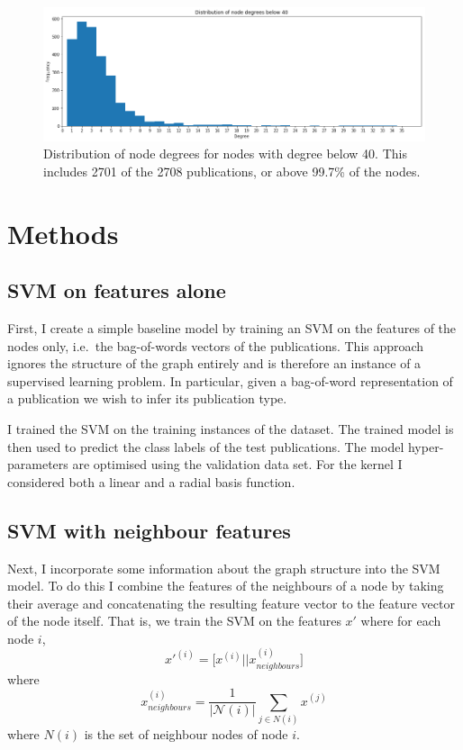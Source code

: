 \documentclass[12pt]{article}
\theoremstyle{definition}
\begin{document}
\begin{figure}[h]
	\includegraphics[width=1.0\textwidth]{node_degrees_truncated}
	\centering
	\caption{Distribution of node degrees for nodes with degree below 40. This includes 2701 of the 2708 publications, or above 99.7\% of the nodes.}
	\label{fig/node_degrees_truncated}
\end{figure}

\section{Methods}
\subsection{SVM on features alone}
First, I create a simple baseline model by training an SVM on the features of the nodes only, i.e.\ the bag-of-words vectors of the publications. This approach ignores the structure of the graph entirely and is therefore an instance of a supervised learning problem. In particular, given a bag-of-word representation of a publication we wish to infer its publication type. 

I trained the SVM on the training instances of the dataset. The trained model is then used to predict the class labels of the test publications. The model hyper-parameters are optimised using the validation data set. For the kernel I considered both a linear and a radial basis function.

\subsection{SVM with neighbour features}
Next, I incorporate some information about the graph structure into the SVM model. To do this I combine the features of the neighbours of a node by taking their average and concatenating the resulting feature vector to the feature vector of the node itself. That is, we train the SVM on the features $x'$ where for each node $i$,
\[
	x'^{(i)} = \big[x^{(i)} || x_{neighbours}^{(i)} \big]
\]
where
\[
	x_{neighbours}^{(i)} = \frac{1}{\left\vert \mathcal{N}(i) \right\vert} \sum_{j \in N(i)} x^{(j)}
\]
where $N(i)$ is the set of neighbour nodes of node $i$.
\end{document}
